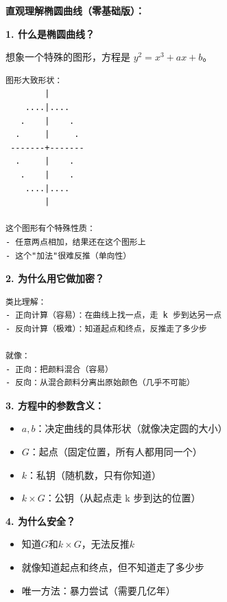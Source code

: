 
\begin{theorybox}
\textbf{直观理解椭圆曲线（零基础版）：}

\textbf{1. 什么是椭圆曲线？}

想象一个特殊的图形，方程是 $y^2 = x^3 + ax + b$。

\begin{lstlisting}
图形大致形状：
        |
    ....|....
   .    |    .
  .     |     .
 -------+------- 
  .     |    .
   .    |    .
    ....|....
        |

这个图形有个特殊性质：
- 任意两点相加，结果还在这个图形上
- 这个"加法"很难反推（单向性）
\end{lstlisting}

\textbf{2. 为什么用它做加密？}

\begin{lstlisting}
类比理解：
- 正向计算（容易）：在曲线上找一点，走 k 步到达另一点
- 反向计算（极难）：知道起点和终点，反推走了多少步

就像：
- 正向：把颜料混合（容易）
- 反向：从混合颜料分离出原始颜色（几乎不可能）
\end{lstlisting}

\textbf{3. 方程中的参数含义：}
\begin{itemize}
\item $a, b$：决定曲线的具体形状（就像决定圆的大小）
\item $G$：起点（固定位置，所有人都用同一个）
\item $k$：私钥（随机数，只有你知道）
\item $k \times G$：公钥（从起点走 k 步到达的位置）
\end{itemize}

\textbf{4. 为什么安全？}
\begin{itemize}
\item 知道$G$和$k \times G$，无法反推$k$
\item 就像知道起点和终点，但不知道走了多少步
\item 唯一方法：暴力尝试（需要几亿年）
\end{itemize}
\end{theorybox}

